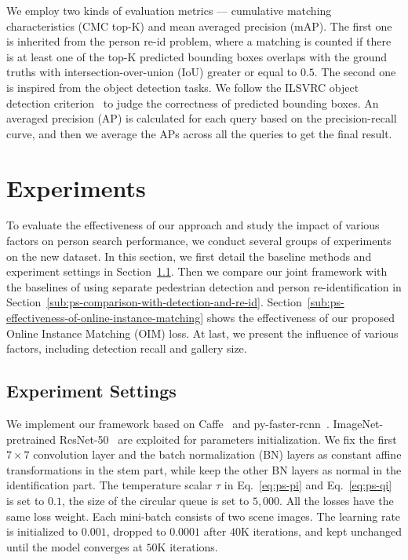 We employ two kinds of evaluation metrics --- cumulative matching characteristics (CMC top-K) and mean averaged precision (mAP). The first one is inherited from the person re-id problem, where a matching is counted if there is at least one of the top-K predicted bounding boxes overlaps with the ground truths with intersection-over-union (IoU) greater or equal to $0.5$. The second one is inspired from the object detection tasks. We follow the ILSVRC object detection criterion~\cite{russakovsky2014imagenet} to judge the correctness of predicted bounding boxes. An averaged precision (AP) is calculated for each query based on the precision-recall curve, and then we average the APs across all the queries to get the final result.


\section{Experiments} %
\label{sec:ps-experiments}
To evaluate the effectiveness of our approach and study the impact of various factors on person search performance, we conduct several groups of experiments on the new dataset. In this section, we first detail the baseline methods and experiment settings in Section~\ref{sub:ps-experiment-settings}. Then we compare our joint framework with the baselines of using separate pedestrian detection and person re-identification in Section~\ref{sub:ps-comparison-with-detection-and-re-id}. Section~\ref{sub:ps-effectiveness-of-online-instance-matching} shows the effectiveness of our proposed Online Instance Matching (OIM) loss. At last, we present the influence of various factors, including detection recall and gallery size.

\subsection{Experiment Settings} %
\label{sub:ps-experiment-settings}
We implement our framework based on Caffe~\cite{jia2014caffe,wang2016temporal} and py-faster-rcnn~\cite{girshick2015fast,ren2015faster}. ImageNet-pretrained ResNet-50~\cite{he2015deep} are exploited for parameters initialization. We fix the first $7\times 7$ convolution layer and the batch normalization (BN) layers as constant affine transformations in the stem part, while keep the other BN layers as normal in the identification part. The temperature scalar $\tau$ in Eq.~\eqref{eq:ps-pi} and Eq.~\eqref{eq:ps-qi} is set to $0.1$, the size of the circular queue is set to $5,000$. All the losses have the same loss weight. Each mini-batch consists of two scene images. The learning rate is initialized to $0.001$, dropped to $0.0001$ after $40$K iterations, and kept unchanged until the model converges at $50$K iterations.

